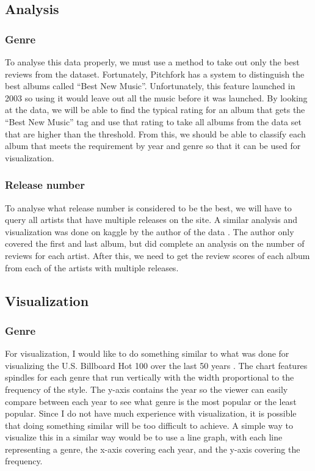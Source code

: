 \documentclass{article}
\begin{document}
\subsection{Analysis}\label{analysis}

\subsubsection{Genre}\label{genre}

To analyse this data properly, we must use a method to take out only the
best reviews from the dataset. Fortunately, Pitchfork has a system to
distinguish the best albums called ``Best New Music''. Unfortunately,
this feature launched in 2003 so using it would leave out all the music
before it was launched. By looking at the data, we will be able to find
the typical rating for an album that gets the ``Best New Music'' tag and
use that rating to take all albums from the data set that are higher
than the threshold. From this, we should be able to classify each album
that meets the requirement by year and genre so that it can be used for
visualization.

\subsubsection{Release number}\label{release-number}

To analyse what release number is considered to be the best, we will
have to query all artists that have multiple releases on the site. A
similar analysis and visualization was done on kaggle by the author of
the data \citep{kaggleFirst}. The author only covered the first and last
album, but did complete an analysis on the number of reviews for each
artist. After this, we need to get the review scores of each album from
each of the artists with multiple releases.

\subsection{Visualization}\label{visualization}

\subsubsection{Genre}\label{genre-1}

For visualization, I would like to do something similar to what was done
for visualizing the U.S. Billboard Hot 100 over the last 50 years
\citep{BillboardFigure}. The chart features spindles for each genre that
run vertically with the width proportional to the frequency of the
style. The y-axis contains the year so the viewer can easily compare
between each year to see what genre is the most popular or the least
popular. Since I do not have much experience with visualization, it is
possible that doing something similar will be too difficult to achieve.
A simple way to visualize this in a similar way would be to use a line
graph, with each line representing a genre, the x-axis covering each
year, and the y-axis covering the frequency.
\end{document}
